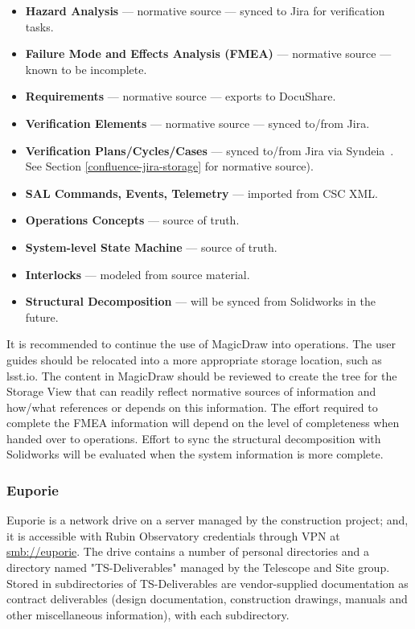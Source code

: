\begin{itemize}
	\item \textbf{Hazard Analysis} --- normative source --- synced to Jira for verification tasks.
	\item \textbf{Failure Mode and Effects Analysis (FMEA)} --- normative source --- known to be incomplete.
	\item \textbf{Requirements} --- normative source --- exports to DocuShare.
	\item \textbf{Verification Elements} --- normative source --- synced to/from Jira.
	\item \textbf{Verification Plans/Cycles/Cases} --- synced to/from Jira via Syndeia\texttrademark\ \citep{syndeia-cite}.
	See Section \ref{confluence-jira-storage} for normative source).
	\item \textbf{SAL Commands, Events, Telemetry} --- imported from CSC XML.
	\item \textbf{Operations Concepts} --- source of truth.
	\item \textbf{System-level State Machine} --- source of truth.
	\item \textbf{Interlocks} --- modeled from source material.
	\item \textbf{Structural Decomposition} --- will be synced from Solidworks in the future.
\end{itemize}

It is recommended to continue the use of MagicDraw into operations.
The user guides should be relocated into a more appropriate storage location, such as lsst.io.
The content in MagicDraw should be reviewed to create the tree for the Storage View that can readily reflect normative sources of information and how/what references or depends on this information.
The effort required to complete the FMEA information will depend on the level of completeness when handed over to operations.
Effort to sync the structural decomposition with Solidworks will be evaluated when the system information is more complete.

\subsubsection{Euporie}

Euporie is a network drive on a server managed by the construction project; and, it is accessible with Rubin Observatory credentials through VPN at \url{smb://euporie}.
The drive contains a number of personal directories and a directory named "TS-Deliverables" managed by the Telescope and Site group.
Stored in subdirectories of TS-Deliverables are vendor-supplied documentation as contract deliverables (design documentation, construction drawings, manuals and other miscellaneous information), with each subdirectory.

